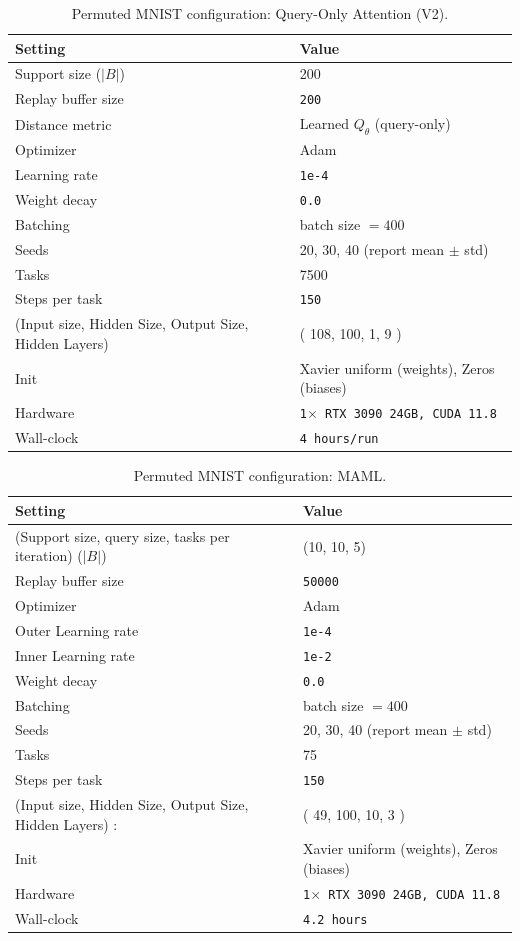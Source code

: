 \documentclass{article}
\begin{document}
\begin{table}[H]
\centering
\footnotesize
\caption{Permuted MNIST configuration: Query-Only Attention (V2).}
\label{tab:pmnist_query_only_attention_v2}
\begin{tabular}{@{}ll@{}}
\toprule
Setting & Value \\ \midrule
Support size ($|B|$) & 200 \\
Replay buffer size & \texttt{200} \\
Distance metric & Learned $Q_{\theta}$ (query-only) \\
Optimizer & Adam \\
Learning rate & \texttt{1e-4} \\
Weight decay & \texttt{0.0} \\
Batching & batch size $=400$ \\
Seeds & 20, 30, 40 (report mean $\pm$ std) \\
Tasks & 7500 \\
Steps per task & \texttt{150} \\
(Input size, Hidden Size, Output Size, Hidden Layers) & ( 108, 100, 1, 9 ) \\ 
Init & Xavier uniform (weights), Zeros (biases) \\
Hardware & \texttt{1$\times$ RTX 3090 24GB, CUDA 11.8} \\
Wall-clock & \texttt{4 hours/run} \\
\bottomrule
\end{tabular}
\end{table}

\begin{table}[H]
\centering
\footnotesize
\caption{Permuted MNIST configuration: MAML.}
\label{tab:pmnist_maml}
\begin{tabular}{@{}ll@{}}
\toprule
Setting & Value \\ \midrule
(Support size, query size, tasks per iteration) ($|B|$) & (10, 10, 5) \\
Replay buffer size & \texttt{50000} \\
Optimizer & Adam \\
Outer Learning rate & \texttt{1e-4} \\
Inner Learning rate & \texttt{1e-2} \\
Weight decay & \texttt{0.0} \\
Batching & batch size $=400$ \\
Seeds & 20, 30, 40 (report mean $\pm$ std) \\
Tasks & 75 \\
Steps per task & \texttt{150} \\
(Input size, Hidden Size, Output Size, Hidden Layers) : & ( 49, 100, 10, 3 ) \\ 
Init & Xavier uniform (weights), Zeros (biases) \\
Hardware & \texttt{1$\times$ RTX 3090 24GB, CUDA 11.8} \\
Wall-clock & \texttt{4.2 hours } \\
\bottomrule
\end{tabular}
\end{table}
\end{document}
